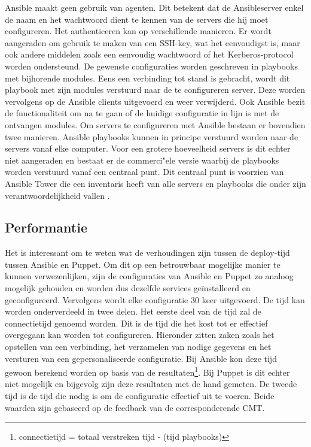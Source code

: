 Ansible maakt geen gebruik van agenten. Dit betekent dat de Ansibleserver enkel de naam en het wachtwoord dient te kennen van de servers die hij moet configureren. Het authenticeren kan op verschillende manieren. Er wordt aangeraden om gebruik te maken van een SSH-key, wat het eenvoudigst is, maar ook andere middelen zoals een eenvoudig wachtwoord of het Kerberos-protocol worden ondersteund. De gewenste configuraties worden geschreven in playbooks met bijhorende modules. Eens een verbinding tot stand is gebracht, wordt dit playbook met zijn modules verstuurd naar de te configureren server. Deze worden vervolgens op de Ansible clients uitgevoerd  en weer verwijderd. Ook Ansible bezit de functionaliteit om na te gaan of de huidige configuratie in lijn is met de ontvangen modules. Om servers te configureren met Ansible bestaan er bovendien twee manieren. Ansible playbooks kunnen in principe verstuurd worden naar de servers vanaf elke computer. Voor een grotere hoeveelheid servers is dit echter niet aangeraden en bestaat er de commerci"ele versie waarbij de playbooks worden verstuurd vanaf een centraal punt. Dit centraal punt is voorzien van Ansible Tower die een inventaris heeft van alle servers en playbooks die onder zijn verantwoordelijkheid vallen \autocite{ansibledoc}.


\subsection{Performantie}

Het is interessant om te weten wat de verhoudingen zijn tussen de deploy-tijd tussen Ansible en Puppet. Om dit op een betrouwbaar mogelijke manier te kunnen verwezenlijken, zijn de configuraties van Ansible en Puppet zo analoog mogelijk gehouden en worden dus dezelfde services ge\"installeerd en geconfigureerd. Vervolgens wordt elke configuratie 30 keer uitgevoerd. De tijd kan worden onderverdeeld in twee delen.\newline
Het eerste deel van de tijd zal de connectietijd genoemd worden. Dit is de tijd die het kost tot er effectief overgegaan kan worden tot configureren. Hieronder zitten zaken zoals het opstellen van een verbinding, het verzamelen van nodige gegevens en het versturen van een gepersonaliseerde configuratie. Bij Ansible kon deze tijd gewoon berekend worden op basis van de resultaten\footnote{connectietijd = totaal verstreken tijd -  \unexpanded{$ \sum  $} (tijd playbooks)}. Bij Puppet is dit echter niet mogelijk en bijgevolg zijn deze resultaten met de hand gemeten.\newline
 De tweede tijd is de tijd die nodig is om de configuratie effectief uit te voeren. Beide waarden zijn gebaseerd op de feedback van de corresponderende \gls{CMT}.

